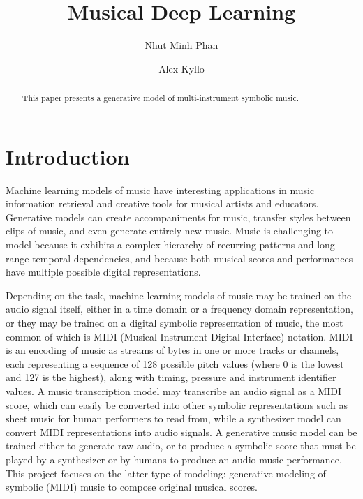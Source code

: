 \documentclass[sigconf,authorversion]{acmart}
\begin{document}
\renewcommand\footnotetextcopyrightpermission[1]{}
\pagestyle{plain}
\title{Musical Deep Learning}

\author{Nhut Minh Phan}

\author{Alex Kyllo}

\begin{abstract}
  This paper presents a generative model of multi-instrument symbolic
  music.
\end{abstract}


\maketitle

\section{Introduction}

Machine learning models of music have interesting applications in
music information retrieval and creative tools for musical artists and
educators. Generative models can create accompaniments for music,
transfer styles between clips of music, and even generate entirely new
music. Music is challenging to model because it exhibits a complex
hierarchy of recurring patterns and long-range temporal dependencies,
and because both musical scores and performances have multiple
possible digital representations.

Depending on the task, machine learning models of music may be trained
on the audio signal itself, either in a time domain or a frequency
domain representation, or they may be trained on a digital symbolic
representation of music, the most common of which is MIDI (Musical
Instrument Digital Interface) notation. MIDI is an encoding of music
as streams of bytes in one or more tracks or channels, each
representing a sequence of 128 possible pitch values (where 0 is the
lowest and 127 is the highest), along with timing, pressure and
instrument identifier values. A music transcription model may
transcribe an audio signal as a MIDI score, which can easily be
converted into other symbolic representations such as sheet music for
human performers to read from, while a synthesizer model can convert
MIDI representations into audio signals. A generative music model can
be trained either to generate raw audio, or to produce a symbolic
score that must be played by a synthesizer or by humans to produce an
audio music performance. This project focuses on the latter type of
modeling: generative modeling of symbolic (MIDI) music to compose
original musical scores.
\end{document}
